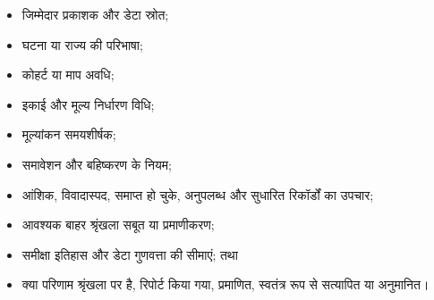 \documentclass[11pt]{article}
\begin{document}
\begin{itemize}[leftmargin=*]
\item जिम्मेदार प्रकाशक और डेटा स्रोत;
\item घटना या राज्य की परिभाषा;
\item कोहर्ट या माप अवधि;
\item इकाई और मूल्य निर्धारण विधि;
\item मूल्यांकन समयशीर्षक;
\item समावेशन और बहिष्करण के नियम;
\item आंशिक, विवादास्पद, समाप्त हो चुके, अनुपलब्ध और सुधारित रिकॉर्डों का उपचार;
\item आवश्यक बाहर श्रृंखला सबूत या प्रमाणीकरण;
\item समीक्षा इतिहास और डेटा गुणवत्ता की सीमाएं; तथा
\item क्या परिणाम श्रृंखला पर है, रिपोर्ट किया गया, प्रमाणित, स्वतंत्र रूप से सत्यापित या अनुमानित।
\end{itemize}
\end{document}
